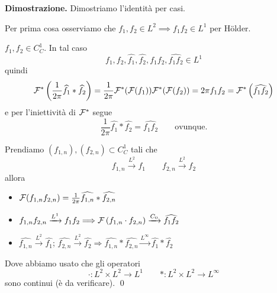 \textbf{Dimostrazione.} Dimostriamo l'identità per casi.

Per prima cosa osserviamo che $f_1, f_2 \in L^2 \implies f_1 f_2 \in L^1$ per H\"older. 

 $f_1,f_2 \in C_C^1$. In tal caso
$$
	f_1,f_2,\hat{f_1},\hat{f_2},f_1f_2,\hat{f_1f_2} \in L^1
$$
quindi
$$
	\mathcal{F}^* \left( \frac{1}{2\pi} \widehat{f_1} \ast \widehat{f_2} \right) = \frac{1}{2\pi} \mathcal{F}^*(\mathcal{F}(f_1))\mathcal{F}^*(\mathcal{F}(f_2)) = 2\pi f_1 f_2 = \mathcal{F}^* \left( \widehat{f_1f_2} \right)
$$
e per l'iniettività di $\mathcal{F}^*$ segue
$$
	\frac{1}{2\pi} \hat{f_1} \ast \hat{f_2} = \hat{f_1f_2} \qquad \text{ovunque}.
$$

 Prendiamo $(f_{1,n}), (f_{2,n}) \subset C_C^1$ tali che 
$$
	f_{1,n} \xrightarrow{L^2} f_1 \qquad f_{2,n} \xrightarrow{L^2} f_2
$$
allora
\begin{itemize}

	\item $\mathcal{F}(f_{1,n} f_{2,n}) = \frac{1}{2\pi} \widehat{f_{1,n}} \ast \widehat{f_{2,n}}$

	\item $f_{1,n} f_{2,n} \xrightarrow{L^1} f_1 f_2 \Longrightarrow \mathcal{F}\left( f_{1,n} \cdot f_{2,n} \right) \xrightarrow{C_0} \widehat{f_1 f_2}$

	\item $\hat{f_{1,n}} \xrightarrow{L^2} \hat{f_1}$; $\hat{f_{2,n}} \xrightarrow{L^2} \hat{f_2} \Longrightarrow \hat{f_{1,n}} \ast \hat{f_{2,n}} \xrightarrow{L^\infty} \hat{f_1} \ast \hat{f_2}$

\end{itemize}
Dove abbiamo usato che gli operatori
$$
	\cdot \colon L^2 \times L^2 \longrightarrow L^1 \qquad \ast \colon L^2 \times L^2 \longrightarrow L^\infty
$$
sono continui (è da verificare). \qed


